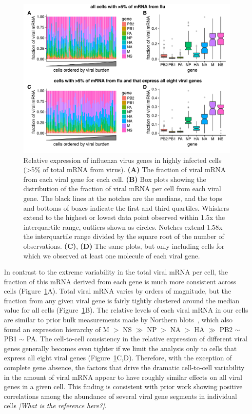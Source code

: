 \documentclass[9pt,lineno]{elife}
\newcommand{\jdbcomment}[1]{\emph{\color{red} [#1]}}
\begin{document}
\begin{figure}
\centerline{\includegraphics[width=0.9\linewidth]{figures/p_flu_expr_aledit.pdf}}
\caption{\label{fig:fluexpr}
Relative expression of influenza virus genes in highly infected cells (>5\% of total mRNA from virus).
{\bf (A)} 
The fraction of viral mRNA from each viral gene for each cell. 
{\bf (B)}
Box plots showing the distribution of the fraction of viral mRNA per cell from each viral gene.
The black lines at the notches are the medians, and the tops and bottoms of boxes indicate the first and third quartiles.
Whiskers extend to the highest or lowest data point observed within 1.5x the interquartile range, outliers shown as circles.
Notches extend 1.58x the interquartile range divided by the square root of the number of observations. 
{\bf (C)}, {\bf (D)} 
The same plots, but only including cells for which we observed at least one molecule of each viral gene.
}
\end{figure}

In contrast to the extreme variability in the total viral mRNA per cell, the fraction of this mRNA derived from each gene is much more consistent across cells (Figure~\ref{fig:fluexpr}A).
Total viral mRNA varies by orders of magnitude, but the fraction from any given viral gene is fairly tightly clustered around the median value for all cells (Figure~\ref{fig:fluexpr}B).
The relative levels of each viral mRNA in our cells are similar to prior bulk measurements made by Northern blots~\citep{Hatada:1989vz}, which also found an expression hierarchy of M $>$ NS $\gg$ NP $>$ NA $>$ HA $\gg$ PB2 $\sim$ PB1 $\sim$ PA.
The cell-to-cell consistency in the relative expression of different viral genes generally becomes even tighter if we limit the analysis only to cells that express all eight viral genes (Figure~\ref{fig:fluexpr}C,D).
Therefore, with the exception of complete gene absence, the factors that drive the dramatic cell-to-cell variability in the amount of viral mRNA appear to have roughly similar effects on all viral genes in a given cell.
This finding is consistent with prior work showing positive correlations among the abundance of several viral gene segments in individual cells \jdbcomment{What is the reference here?}.
\end{document}
